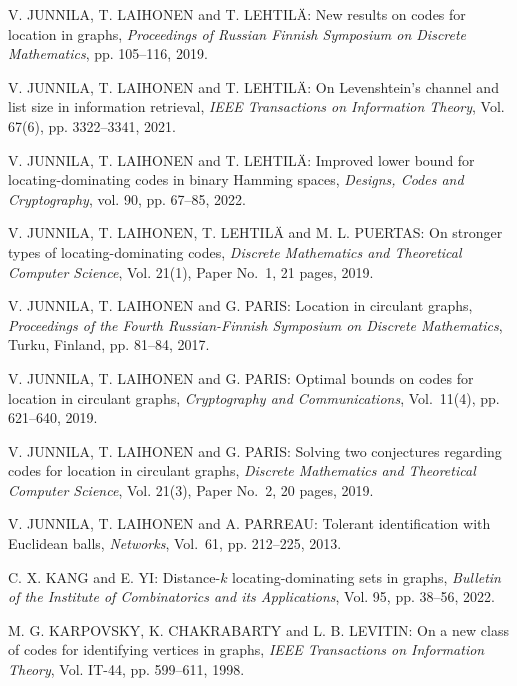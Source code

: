 \begin{thebibliography}{999}
V. JUNNILA, T. LAIHONEN and T. LEHTIL\"A: New results on codes for location in graphs, {\it Proceedings of Russian Finnish Symposium on Discrete Mathematics}, pp. 105--116, 2019.

V. JUNNILA, T. LAIHONEN and T. LEHTIL\"A: On Levenshtein's channel and list size in information retrieval, {\it IEEE Transactions on Information Theory}, Vol. 67(6), pp. 3322--3341, 2021.

V. JUNNILA, T. LAIHONEN and T. LEHTIL\"A: Improved lower bound for locating-dominating codes in binary Hamming spaces, {\it Designs, Codes and Cryptography}, vol. 90, pp. 67--85, 2022.

V. JUNNILA, T. LAIHONEN, T. LEHTIL\"A and M. L. PUERTAS: On stronger types of locating-dominating codes, {\it Discrete Mathematics and Theoretical Computer Science}, Vol. 21(1), Paper No.~1, 21 pages, 2019.

V. JUNNILA, T. LAIHONEN and G. PARIS: Location in circulant graphs, {\it Proceedings of the Fourth Russian-Finnish Symposium on Discrete Mathematics}, Turku, Finland, pp. 81--84, 2017.

V. JUNNILA, T. LAIHONEN and G. PARIS: Optimal bounds on codes for location in circulant graphs, {\it Cryptography and Communications}, Vol.~11(4), pp. 621--640, 2019.

V. JUNNILA, T. LAIHONEN and G. PARIS: Solving two conjectures regarding codes for location in circulant graphs, {\it Discrete Mathematics and Theoretical Computer Science}, Vol. 21(3), Paper No.~2, 20 pages, 2019.

V. JUNNILA, T. LAIHONEN and A. PARREAU: Tolerant identification with Euclidean balls, {\it Networks}, Vol.~61, pp. 212--225, 2013.

C. X. KANG and E. YI: Distance-$k$ locating-dominating sets in graphs, {\it Bulletin of the Institute of Combinatorics and its Applications}, Vol. 95, pp. 38--56, 2022.

%
M. G. KARPOVSKY, K. CHAKRABARTY and L. B. LEVITIN: On a new class of codes for identifying vertices in graphs, {\it IEEE Transactions on Information Theory}, Vol. IT-44, pp. 599--611, 1998.


\end{thebibliography}

